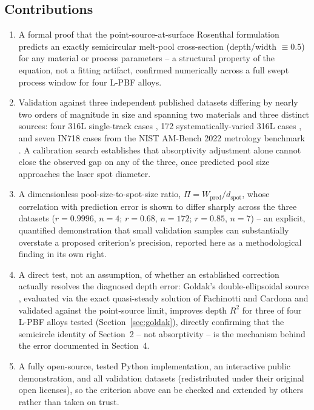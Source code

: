 \documentclass[12pt]{article}
\begin{document}
\subsection{Contributions}
\begin{enumerate}
\item A formal proof that the point-source-at-surface Rosenthal formulation predicts an exactly semicircular melt-pool cross-section (depth/width $\equiv 0.5$) for any material or process parameters -- a structural property of the equation, not a fitting artifact, confirmed numerically across a full swept process window for four L-PBF alloys.
\item Validation against three independent published datasets differing by nearly two orders of magnitude in size and spanning two materials and three distinct sources: four 316L single-track cases \cite{zhang2024}, 172 systematically-varied 316L cases \cite{hofmann2026}, and seven IN718 cases from the NIST AM-Bench 2022 metrology benchmark \cite{weaver2024}. A calibration search establishes that absorptivity adjustment alone cannot close the observed gap on any of the three, once predicted pool size approaches the laser spot diameter.
\item A dimensionless pool-size-to-spot-size ratio, $\Pi = W_{\text{pred}}/d_{\text{spot}}$, whose correlation with prediction error is shown to differ sharply across the three datasets ($r=0.9996$, $n=4$; $r=0.68$, $n=172$; $r=0.85$, $n=7$) -- an explicit, quantified demonstration that small validation samples can substantially overstate a proposed criterion's precision, reported here as a methodological finding in its own right.
\item A direct test, not an assumption, of whether an established correction actually resolves the diagnosed depth error: Goldak's double-ellipsoidal source \cite{goldak1984}, evaluated via the exact quasi-steady solution of Fachinotti and Cardona \cite{fachinotti2008} and validated against the point-source limit, improves depth $R^2$ for three of four L-PBF alloys tested (Section~\ref{sec:goldak}), directly confirming that the semicircle identity of Section~2 -- not absorptivity -- is the mechanism behind the error documented in Section~4.
\item A fully open-source, tested Python implementation, an interactive public demonstration, and all validation datasets (redistributed under their original open licenses), so the criterion above can be checked and extended by others rather than taken on trust.
\end{enumerate}
\end{document}
